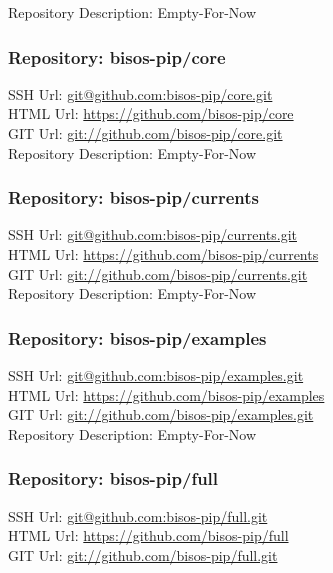 Repository Description: Empty-For-Now

\subsubsection{Repository: bisos-pip/core}

SSH Url:  \url{git@github.com:bisos-pip/core.git}\\
HTML Url: \url{https://github.com/bisos-pip/core}\\
GIT Url:  \url{git://github.com/bisos-pip/core.git}\\


Repository Description: Empty-For-Now

\subsubsection{Repository: bisos-pip/currents}

SSH Url:  \url{git@github.com:bisos-pip/currents.git}\\
HTML Url: \url{https://github.com/bisos-pip/currents}\\
GIT Url:  \url{git://github.com/bisos-pip/currents.git}\\


Repository Description: Empty-For-Now

\subsubsection{Repository: bisos-pip/examples}

SSH Url:  \url{git@github.com:bisos-pip/examples.git}\\
HTML Url: \url{https://github.com/bisos-pip/examples}\\
GIT Url:  \url{git://github.com/bisos-pip/examples.git}\\


Repository Description: Empty-For-Now

\subsubsection{Repository: bisos-pip/full}

SSH Url:  \url{git@github.com:bisos-pip/full.git}\\
HTML Url: \url{https://github.com/bisos-pip/full}\\
GIT Url:  \url{git://github.com/bisos-pip/full.git}\\


